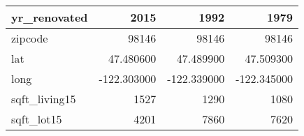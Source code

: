 \begin{table}[H]
\begin{tabular}{|l|r|r|r|}
\hline yr\_renovated & \cellcolor[rgb]{0.9, 0.54, 0.52} 2015 & 1992 & 1979 \\
\hline zipcode & \cellcolor[rgb]{0.9, 0.54, 0.52} 98146 & \cellcolor[rgb]{0.9, 0.54, 0.52} 98146 & \cellcolor[rgb]{0.9, 0.54, 0.52} 98146 \\
\hline lat & \cellcolor[rgb]{0.9, 0.54, 0.52} 47.480600 & 47.489900 & 47.509300 \\
\hline long & \cellcolor[rgb]{0.9, 0.54, 0.52} -122.303000 & \cellcolor[rgb]{0.9, 0.54, 0.52} -122.339000 & \cellcolor[rgb]{0.9, 0.54, 0.52} -122.345000 \\
\hline sqft\_living15 & \cellcolor[rgb]{0.9, 0.54, 0.52} 1527 & 1290 & 1080 \\
\hline sqft\_lot15 & \cellcolor[rgb]{0.9, 0.54, 0.52} 4201 & 7860 & 7620 \\
\hline
\end{tabular}
\end{table}
